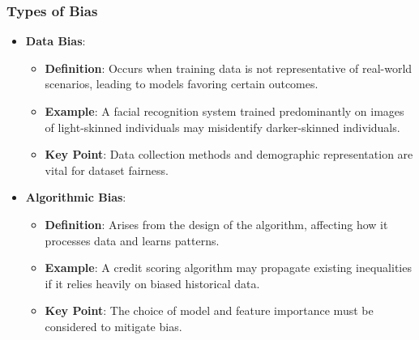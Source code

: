 \documentclass[aspectratio=169]{beamer}
\begin{document}
\begin{frame}[fragile]
    \frametitle{Types of Bias}
    \begin{itemize}
        \item \textbf{Data Bias}:
        \begin{itemize}
            \item \textbf{Definition}: Occurs when training data is not representative of real-world scenarios, leading to models favoring certain outcomes.
            \item \textbf{Example}: A facial recognition system trained predominantly on images of light-skinned individuals may misidentify darker-skinned individuals.
            \item \textbf{Key Point}: Data collection methods and demographic representation are vital for dataset fairness.
        \end{itemize}
        
        \item \textbf{Algorithmic Bias}:
        \begin{itemize}
            \item \textbf{Definition}: Arises from the design of the algorithm, affecting how it processes data and learns patterns.
            \item \textbf{Example}: A credit scoring algorithm may propagate existing inequalities if it relies heavily on biased historical data.
            \item \textbf{Key Point}: The choice of model and feature importance must be considered to mitigate bias.
        \end{itemize}
    \end{itemize}
\end{frame}
\end{document}
